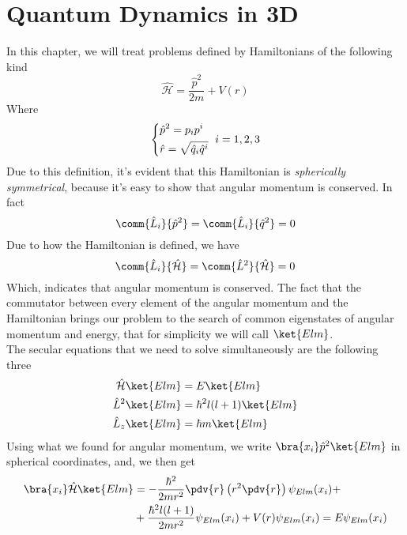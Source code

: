 \documentclass[a4paper, 11pt]{book}
\newcommand{\1}{\opr{\mathds{1}}}
\newcommand{\ham}{\mathcal{H}}
\newcommand{\opr}[1]{\hat{#1}}
\theoremstyle{plain}
\begin{document}
	\chapter{Quantum Dynamics in 3D}
	In this chapter, we will treat problems defined by Hamiltonians of the following kind
	\begin{equation}
		\opr{\ham}=\frac{\opr{p}^2}{2m}+V(r)
		\label{eq:centralpotentialham}
	\end{equation}
	Where
	\begin{equation*}
		\begin{dcases}
			\opr{p}^2=p_ip^i\\
			\opr{r}=\sqrt{\opr{q}_i\opr{q}^i}
		\end{dcases}\ i=1,2,3
	\end{equation*}
	Due to this definition, it's evident that this Hamiltonian is \textit{spherically symmetrical}, because it's easy to show that angular momentum is conserved. In fact
	\begin{equation*}
		\comm{\opr{L}_i}{\opr{p}^2}=\comm{\opr{L}_i}{\opr{q}^2}=0
	\end{equation*}
	Due to how the Hamiltonian is defined, we have
	\begin{equation}
		\comm{\opr{L}_i}{\opr{\ham}}=\comm{\opr{L}^2}{\opr{\ham}}=0
		\label{eq:conservationangmom}
	\end{equation}
	Which, indicates that angular momentum is conserved. The fact that the commutator between every element of the angular momentum and the Hamiltonian brings our problem to the search of common eigenstates of angular momentum and energy, that for simplicity we will call $\ket{Elm}$.\\
	The secular equations that we need to solve simultaneously are the following three
	\begin{equation}
		\begin{aligned}
			\opr{\ham}\ket{Elm}&=E\ket{Elm}\\
			\opr{L}^2\ket{Elm}&=\hbar^2l(l+1)\ket{Elm}\\
			\opr{L}_z\ket{Elm}&=\hbar m\ket{Elm}
		\end{aligned}
		\label{eq:sphersimmseceq}
	\end{equation}
	Using what we found for angular momentum, we write $\bra{x_i}\opr{p}^2\ket{Elm}$ in spherical coordinates, and, we then get
	\begin{equation}
		\begin{aligned}
			\bra{x_i}\opr{\ham}\ket{Elm}&=-\frac{\hbar^2}{2mr^2}\pdv{r}\left( r^2\pdv{r} \right)\psi_{Elm}(x_i)+\\
			&+\frac{\hbar^2l(l+1)}{2mr^2}\psi_{Elm}(x_i)+V(r)\psi_{Elm}(x_i)=E\psi_{Elm}(x_i)
		\end{aligned}
		\label{eq:schreqcentralpot}
	\end{equation}
\end{document}
